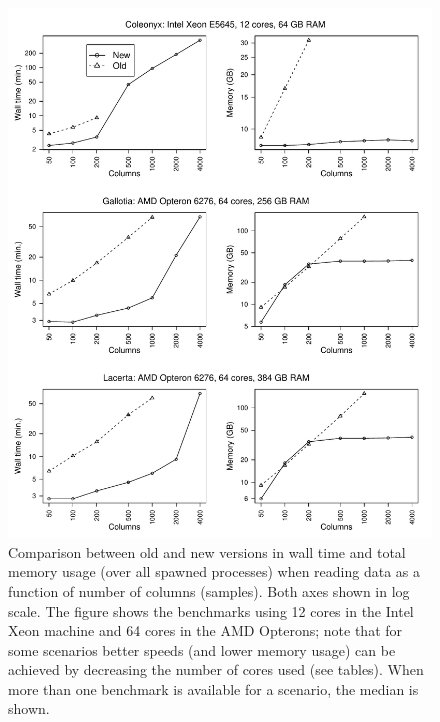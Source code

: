 \documentclass[a4paper,11pt]{article}
\begin{document}
\clearpage
\begin{figure}[h!]
\begin{center}
  \includegraphics[width=16.1cm,keepaspectratio]{reading-benchmark-fig.pdf}
\end{center}
\caption[Wall time and memory usage when reading data: version
comparison]{\label{fig-read} Comparison between old and new versions in
  wall time and total memory usage (over all spawned processes) when
  reading data as a function of number of columns (samples). Both axes
  shown in log scale. The figure shows the benchmarks using 12 cores in
  the Intel Xeon machine and 64 cores in the AMD Opterons; note that for
  some scenarios better speeds (and lower memory usage) can be achieved by
  decreasing the number of cores used (see tables). When more than one
  benchmark is available for a scenario, the median is shown.}

\end{figure}

\begin{center}

\clearpage

\clearpage

\end{center}
\end{document}
